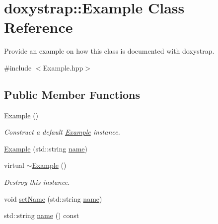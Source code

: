 \hypertarget{classdoxystrap_1_1Example}{}\section{doxystrap\+:\+:Example Class Reference}
\label{classdoxystrap_1_1Example}


Provide an example on how this class is documented with {\ttfamily doxystrap}.  




{\ttfamily \#include $<$Example.\+hpp$>$}

\subsection*{Public Member Functions}
\begin{DoxyCompactItemize}
\item 
\hyperlink{classdoxystrap_1_1Example_a751a441b29092bee80a767e7fe859d8b}{Example} ()\hypertarget{classdoxystrap_1_1Example_a751a441b29092bee80a767e7fe859d8b}{}\label{classdoxystrap_1_1Example_a751a441b29092bee80a767e7fe859d8b}

\begin{DoxyCompactList}\small\item\em Construct a default \hyperlink{classdoxystrap_1_1Example}{Example} instance. \end{DoxyCompactList}\item 
\hyperlink{classdoxystrap_1_1Example_abf09794ee87d5524c1467ecef5e8b1f6}{Example} (std\+::string \hyperlink{classdoxystrap_1_1Example_a4a8fe8f5e42b0736d0985f55f6e85732}{name})
\item 
virtual \hyperlink{classdoxystrap_1_1Example_ab36c9c78eaca662c800268ae34ae1386}{$\sim$\+Example} ()\hypertarget{classdoxystrap_1_1Example_ab36c9c78eaca662c800268ae34ae1386}{}\label{classdoxystrap_1_1Example_ab36c9c78eaca662c800268ae34ae1386}

\begin{DoxyCompactList}\small\item\em Destroy this instance. \end{DoxyCompactList}\item 
void \hyperlink{classdoxystrap_1_1Example_ab90e1dadb589e21d10e63ff1a124f3fc}{set\+Name} (std\+::string \hyperlink{classdoxystrap_1_1Example_a4a8fe8f5e42b0736d0985f55f6e85732}{name})
\item 
std\+::string \hyperlink{classdoxystrap_1_1Example_a4a8fe8f5e42b0736d0985f55f6e85732}{name} () const \hypertarget{classdoxystrap_1_1Example_a4a8fe8f5e42b0736d0985f55f6e85732}{}\label{classdoxystrap_1_1Example_a4a8fe8f5e42b0736d0985f55f6e85732}


\end{DoxyCompactItemize}
